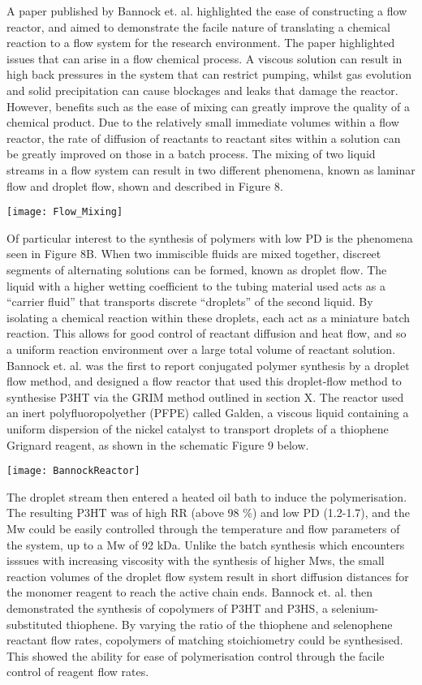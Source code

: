 A paper published by Bannock et. al. highlighted the ease of constructing a flow reactor, and aimed to demonstrate the facile nature of translating a chemical reaction to a flow system for the research environment. The paper highlighted issues that can arise in a flow chemical process. A viscous solution can result in high back pressures in the system that can restrict pumping, whilst gas evolution and solid precipitation can cause blockages and leaks that damage the reactor. However, benefits such as the ease of mixing can greatly improve the quality of a chemical product. Due to the relatively small immediate volumes within a flow reactor, the rate of diffusion of reactants to reactant sites within a solution can be greatly improved on those in a batch process. The mixing of two liquid streams in a flow system can result in two different phenomena, known as laminar flow and droplet flow, shown and described in Figure 8.

\texttt{[image: Flow\_Mixing]}

Of particular interest to the synthesis of polymers with low PD is the phenomena seen in Figure 8B. When two immiscible fluids are mixed together, discreet segments of alternating solutions can be formed, known as droplet flow. The liquid with a higher wetting coefficient to the tubing material used acts as a “carrier fluid” that transports discrete “droplets” of the second liquid. By isolating a chemical reaction within these droplets, each act as a miniature batch reaction. This allows for good control of reactant diffusion and heat flow, and so a uniform reaction environment over a large total volume of reactant solution. Bannock et. al. was the first to report conjugated polymer synthesis by a droplet flow method, and designed a flow reactor that used this droplet-flow method to synthesise P3HT via the GRIM method outlined in section X. The reactor used an inert polyfluoropolyether (PFPE) called Galden, a viscous liquid containing a uniform dispersion of the nickel catalyst to transport droplets of a thiophene Grignard reagent, as shown in the schematic Figure 9 below. 

\texttt{[image: BannockReactor]}

The droplet stream then entered a heated oil bath to induce the polymerisation. The resulting P3HT was of high RR (above 98 \%) and low PD (1.2-1.7), and the Mw could be easily controlled through the temperature and flow parameters of the system, up to a Mw of 92 kDa. Unlike the batch synthesis which encounters isssues with increasing viscosity with the synthesis of higher Mws, the small reaction volumes of the droplet flow system result in short diffusion distances for the monomer reagent to reach the active chain ends. Bannock et. al. then demonstrated the synthesis of copolymers of P3HT and P3HS, a selenium-substituted thiophene. By varying the ratio of the thiophene and selenophene reactant flow rates, copolymers of matching stoichiometry could be synthesised. This showed the ability for ease of polymerisation control through the facile control of reagent flow rates.

